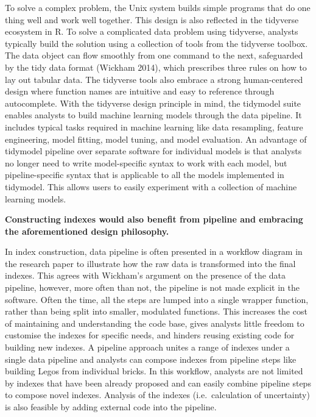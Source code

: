 \documentclass[
]{article}
\begin{document}
To solve a complex problem, the Unix system builds simple programs that
do one thing well and work well together. This design is also reflected
in the tidyverse ecosystem in R. To solve a complicated data problem
using tidyverse, analysts typically build the solution using a
collection of tools from the tidyverse toolbox. The data object can flow
smoothly from one command to the next, safeguarded by the tidy data
format (Wickham 2014), which prescribes three rules on how to lay out
tabular data. The tidyverse tools also embrace a strong human-centered
design where function names are intuitive and easy to reference through
autocomplete. With the tidyverse design principle in mind, the tidymodel
suite enables analysts to build machine learning models through the data
pipeline. It includes typical tasks required in machine learning like
data resampling, feature engineering, model fitting, model tuning, and
model evaluation. An advantage of tidymodel pipeline over separate
software for individual models is that analysts no longer need to write
model-specific syntax to work with each model, but pipeline-specific
syntax that is applicable to all the models implemented in tidymodel.
This allows users to easily experiment with a collection of machine
learning models.

\textbf{Constructing indexes would also benefit from pipeline and
embracing the aforementioned design philosophy.}

In index construction, data pipeline is often presented in a workflow
diagram in the research paper to illustrate how the raw data is
transformed into the final indexes. This agrees with Wickham's argument
on the presence of the data pipeline, however, more often than not, the
pipeline is not made explicit in the software. Often the time, all the
steps are lumped into a single wrapper function, rather than being split
into smaller, modulated functions. This increases the cost of
maintaining and understanding the code base, gives analysts little
freedom to customise the indexes for specific needs, and hinders reusing
existing code for building new indexes. A pipeline approach unites a
range of indexes under a single data pipeline and analysts can compose
indexes from pipeline steps like building Legos from individual bricks.
In this workflow, analysts are not limited by indexes that have been
already proposed and can easily combine pipeline steps to compose novel
indexes. Analysis of the indexes (i.e.~calculation of uncertainty) is
also feasible by adding external code into the pipeline.
\end{document}
